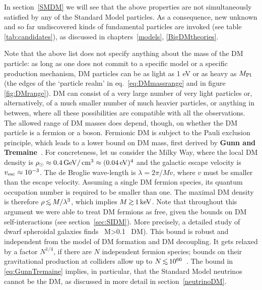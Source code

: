 In section~\ref{SMDM} we will see that
the above properties are not simultaneously satisfied by any of the Standard Model particles. 
As a consequence, new unknown and so far undiscovered kinds of fundamental particles are invoked (see table \ref{tab:candidates}),
as discussed in chapters~\ref{models}, \ref{BigDMtheories}.


\medskip

Note that the above list does not specify anything about the mass of the DM particle: as long as one does not commit to a specific model or a specific production mechanism, DM particles can be as light as 1 eV or as heavy as $M_{\rm Pl}$ (the edges of the `particle realm' in eq.~\ref{eq:DMmassrange} and in figure \ref{fig:DMrange}). DM can consist of a very large number of very light particles or, alternatively, of a much smaller number of much heavier particles, or anything in between, where all these possibilities are  compatible with all the observations.  
The allowed range of DM masses does depend, though, on whether the DM particle is a fermion or a boson. 
Fermionic DM is subject to the Pauli exclusion principle, which leads to a lower bound on DM mass, first derived by
{\bf Gunn and Tremaine}~\cite{GunnTremaine}.
For concreteness, let us consider the Milky Way, where the local DM density is 
$\rho_\odot \approx 0.4\,{\rm GeV}/\,{\rm cm}^3 \approx (0.04\,{\rm eV})^4$
and the galactic escape velocity is $v_{\rm esc} \approx 10^{-3}$.
The de Broglie wave-length is $\lambda =2\pi/Mv$, where $v$ must be smaller than the escape velocity.
Assuming a single DM fermion species, its quantum occupation number is required to be smaller than one.
The maximal DM density is therefore $\rho \circa{<} M/\lambda^3$, which implies
$M\circa{>}1\keV$. Note that throughout this argument we were able to treat DM fermions as free, given the
bounds on DM self-interactions (see section~\ref{sec:SIDM}). 
More precisely, a  detailed study of dwarf spheroidal galaxies finds~\cite{GunnTremaine}
\beq 
\label{eq:GunnTremaine}
M>0.1\keV  {} \ {\rm DM).}
\eeq
This bound is robust and independent from the model of DM formation and DM decoupling.
It gets relaxed by a factor $N^{1/4}$, if there are $N$ independent fermion species;
bounds on their gravitational production at colliders allow up to $N \circa{<}10^{60}$~\cite{GunnTremaine}.
The bound in \eqref{eq:GunnTremaine} implies, in particular, that the Standard Model neutrinos cannot be the DM, as discussed in more detail in section~\ref{neutrinoDM}.

